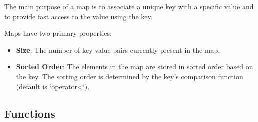 \documentclass{article}
\begin{document}
\noindent The main purpose of a map is to associate a unique key with a specific value and to provide fast access to the value using the key.

\noindent Maps have two primary properties:
\begin{itemize}
    \item \textbf{Size}: The number of key-value pairs currently present in the map.
    \item \textbf{Sorted Order}: The elements in the map are stored in sorted order based on the key. The sorting order is determined by the key's comparison function (default is `operator<`).
\end{itemize}

\subsection{Functions}
\end{document}
